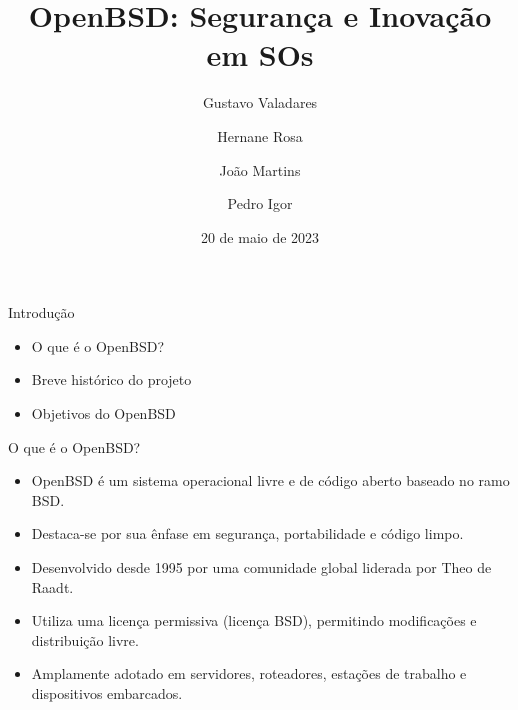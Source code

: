 \documentclass[9pt,xcolor=table]{beamer}
\date{20 de maio de 2023}
\title{OpenBSD: Segurança e Inovação em SOs}
\institute[PUC]{Pontifícia Universidade Católica de Minas Gerais}
\author[Gustavo, Hernane, João Víctor, Pedro]{Gustavo Valadares \and Hernane Rosa \and João Martins \and Pedro Igor}
\begin{document}
\begin{frame}
  \titlepage
\end{frame}
\begin{frame}{Introdução}
  \begin{itemize}
    \item O que é o OpenBSD?
    \item Breve histórico do projeto
    \item Objetivos do OpenBSD
  \end{itemize}
\end{frame}
\begin{frame}{O que é o OpenBSD?}
  \begin{itemize}
    \item OpenBSD é um sistema operacional livre e de código aberto baseado no ramo BSD. \pause
    \item Destaca-se por sua ênfase em segurança, portabilidade e código limpo. \pause
    \item Desenvolvido desde 1995 por uma comunidade global liderada por Theo de Raadt. \pause
    \item Utiliza uma licença permissiva (licença BSD), permitindo modificações e distribuição livre. \pause
    \item Amplamente adotado em servidores, roteadores, estações de trabalho e dispositivos embarcados.
  \end{itemize}
\end{frame}
\end{document}
